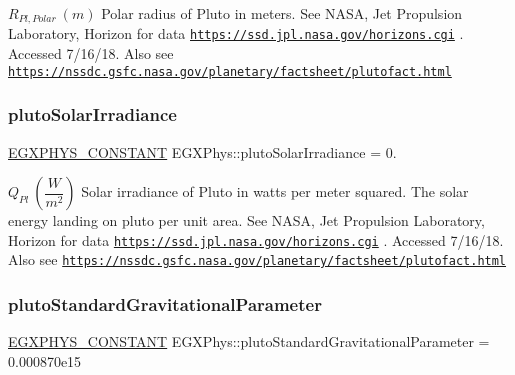 $R_{Pl,Polar} \ (m)$ Polar radius of Pluto in meters. See N\+A\+SA, Jet Propulsion Laboratory, Horizon for data \href{https://ssd.jpl.nasa.gov/horizons.cgi}{\tt https\+://ssd.\+jpl.\+nasa.\+gov/horizons.\+cgi} . Accessed 7/16/18. Also see \href{https://nssdc.gsfc.nasa.gov/planetary/factsheet/plutofact.html}{\tt https\+://nssdc.\+gsfc.\+nasa.\+gov/planetary/factsheet/plutofact.\+html} \mbox{\label{group___e_g_x_phys-_constants-_astrophysics-_solar_system-_pluto-_bulk_ga44054a6e7228949e0e7bee426de56400}} 
\subsubsection{\texorpdfstring{pluto\+Solar\+Irradiance}{plutoSolarIrradiance}}
{\footnotesize\ttfamily \mbox{\hyperlink{group___e_g_x_phys-_constants-_macros_ga76980d288494ce1714c9ac68a95ba702}{E\+G\+X\+P\+H\+Y\+S\+\_\+\+C\+O\+N\+S\+T\+A\+NT}} E\+G\+X\+Phys\+::pluto\+Solar\+Irradiance = 0.}

$ Q_{Pl} \ (\dfrac{W}{m^2})$ Solar irradiance of Pluto in watts per meter squared. The solar energy landing on pluto per unit area. See N\+A\+SA, Jet Propulsion Laboratory, Horizon for data \href{https://ssd.jpl.nasa.gov/horizons.cgi}{\tt https\+://ssd.\+jpl.\+nasa.\+gov/horizons.\+cgi} . Accessed 7/16/18. Also see \href{https://nssdc.gsfc.nasa.gov/planetary/factsheet/plutofact.html}{\tt https\+://nssdc.\+gsfc.\+nasa.\+gov/planetary/factsheet/plutofact.\+html} \mbox{\label{group___e_g_x_phys-_constants-_astrophysics-_solar_system-_pluto-_bulk_gade5772f124606cf8e1603f344f4faf22}} 
\subsubsection{\texorpdfstring{pluto\+Standard\+Gravitational\+Parameter}{plutoStandardGravitationalParameter}}
{\footnotesize\ttfamily \mbox{\hyperlink{group___e_g_x_phys-_constants-_macros_ga76980d288494ce1714c9ac68a95ba702}{E\+G\+X\+P\+H\+Y\+S\+\_\+\+C\+O\+N\+S\+T\+A\+NT}} E\+G\+X\+Phys\+::pluto\+Standard\+Gravitational\+Parameter = 0.\+000870e15}

